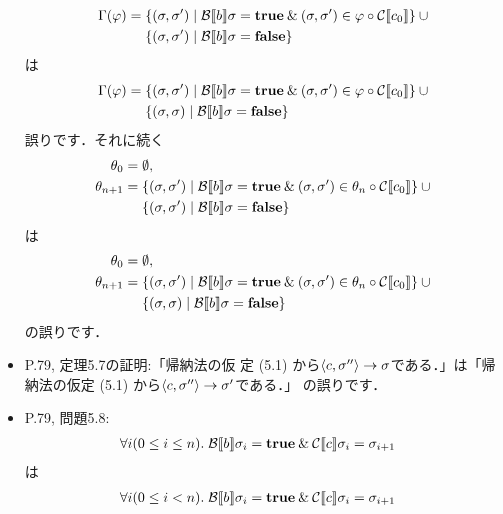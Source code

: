 \documentclass[12pt,titlepage,twoside,openright,dvipdfmx]{jsbook}
\theoremstyle{definition}
\begin{document}
\begin{itemize}
\begin{align*}
      \Gamma(\varphi) = {}
      & \{(\sigma,\sigma')\mid  \mathcal{B}\llbracket{b}\rrbracket\sigma=\mathbf{true}\mathbin{\&}
        (\sigma,\sigma')\in\varphi\circ\mathcal{C}\llbracket{c_0}\rrbracket\} \cup {} \\
      & \{(\sigma,\sigma')\mid  \mathcal{B}\llbracket{b}\rrbracket\sigma=\mathbf{false}\}
    \end{align*}
    は
    \begin{align*}
      \Gamma(\varphi) = {}
      & \{(\sigma,\sigma')\mid  \mathcal{B}\llbracket{b}\rrbracket\sigma=\mathbf{true}\mathbin{\&}
        (\sigma,\sigma')\in\varphi\circ\mathcal{C}\llbracket{c_0}\rrbracket\} \cup {} \\
      & \{(\sigma,\sigma)\mid  \mathcal{B}\llbracket{b}\rrbracket\sigma=\mathbf{false}\}
    \end{align*}
    誤りです．それに続く
    \begin{align*}
      \theta_0 = {} & \emptyset, \\
      \theta_{n+1} = {}
                    & \{(\sigma,\sigma')\mid  \mathcal{B}\llbracket{b}\rrbracket\sigma=\mathbf{true}\mathbin{\&}
                      (\sigma,\sigma')\in\theta_n\circ\mathcal{C}\llbracket{c_0}\rrbracket\} \cup {}\\
                    & \{(\sigma,\sigma')\mid  \mathcal{B}\llbracket{b}\rrbracket\sigma=\mathbf{false}\}
    \end{align*}
    は
    \begin{align*}
      \theta_0 = {} & \emptyset, \\
      \theta_{n+1} = {}
                    & \{(\sigma,\sigma')\mid  \mathcal{B}\llbracket{b}\rrbracket\sigma=\mathbf{true}\mathbin{\&}
                      (\sigma,\sigma')\in\theta_n\circ\mathcal{C}\llbracket{c_0}\rrbracket\} \cup {}\\
                    & \{(\sigma,\sigma)\mid  \mathcal{B}\llbracket{b}\rrbracket\sigma=\mathbf{false}\}
    \end{align*}
    の誤りです．
  \item P.79, 定理5.7の証明:「帰納法の仮
    定 (5.1) から$\langle{c,\sigma''}\rangle\rightarrow\sigma$である．」は「帰
    納法の仮定 (5.1) から$\langle{c,\sigma''}\rangle\rightarrow\sigma'$である．」
    の誤りです．
  \item P.79, 問題5.8:
    \begin{align*}
      & \forall{i(0\leq i\leq n)}.\;
        \mathcal{B}\llbracket{b}\rrbracket\sigma_i=\mathbf{true}\mathbin{\&}
        \mathcal{C}\llbracket{c}\rrbracket\sigma_i=\sigma_{i+1}
    \end{align*}
    は
    \begin{align*}
      & \forall{i(0\leq i < n)}.\;
        \mathcal{B}\llbracket{b}\rrbracket\sigma_i=\mathbf{true}\mathbin{\&}
        \mathcal{C}\llbracket{c}\rrbracket\sigma_i=\sigma_{i+1}
    \end{align*}

\end{itemize}
\end{document}
